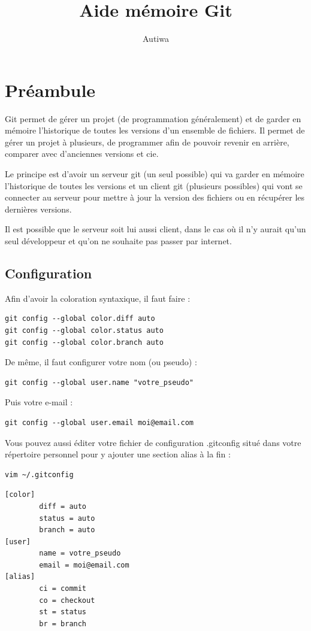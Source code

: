 \documentclass[a4paper,twoside]{article}
\title{Aide mémoire Git}
\author{Autiwa}
\begin{document}
\tableofcontents

\clearpage

\section{Préambule}
Git permet de gérer un projet (de programmation généralement) et de garder en mémoire l'historique de toutes les versions d'un ensemble de fichiers. Il permet de gérer un projet à plusieurs, de programmer afin de pouvoir revenir en arrière, comparer avec d'anciennes versions et cie. 

Le principe est d'avoir un serveur git (un seul possible) qui va garder en mémoire l'historique de toutes les versions et un client git (plusieurs possibles) qui vont se connecter au serveur pour mettre à jour la version des fichiers ou en récupérer les dernières versions.

\begin{remarque}
Il est possible que le serveur soit lui aussi client, dans le cas où il n'y aurait qu'un seul développeur et qu'on ne souhaite pas passer par internet.
\end{remarque}

\subsection{Configuration}
Afin d'avoir la coloration syntaxique, il faut faire : 
\begin{verbatim}
git config --global color.diff auto
git config --global color.status auto
git config --global color.branch auto
\end{verbatim}

De même, il faut configurer votre nom (ou pseudo) :
\begin{verbatim}
git config --global user.name "votre_pseudo"
\end{verbatim}


Puis votre e-mail :
\begin{verbatim}
git config --global user.email moi@email.com
\end{verbatim}


Vous pouvez aussi éditer votre fichier de configuration .gitconfig situé dans votre répertoire personnel pour y ajouter une section alias à la fin :
\begin{verbatim}
vim ~/.gitconfig
\end{verbatim}

\begin{verbatim}
[color]
        diff = auto
        status = auto
        branch = auto
[user]
        name = votre_pseudo
        email = moi@email.com
[alias]
        ci = commit
        co = checkout
        st = status
        br = branch
\end{verbatim}
\end{document}
